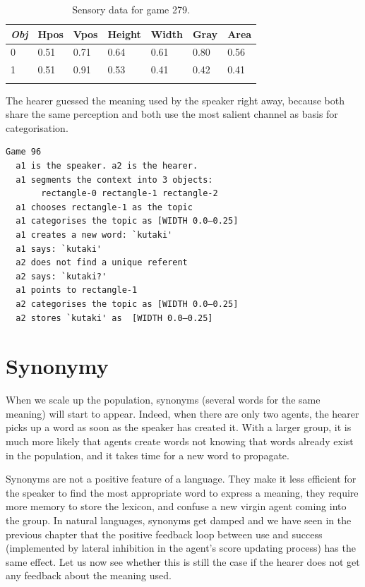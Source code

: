 \begin{table}
\begin{center}
\begin{tabular}{ l  l  l  l  l  l  l }
\lsptoprule
{\itshape Obj}&Hpos&Vpos&Height&Width&Gray&Area \\ \midrule
0 &0.51 & 0.71 & 0.64 & 0.61 & 0.80 & 0.56\\ 
1 & 0.51 & 0.91 & 0.53 & 0.41 & 0.42 & 0.41 \\ 
\lspbottomrule
\end{tabular}
\caption{\label{tab:279}Sensory data for game 279.}
\end{center}
\end{table}
The hearer guessed the meaning used
by the speaker right away, because both 
share the same perception and both use the most 
salient channel as basis for categorisation. 
\begin{verbatim}
Game 96
  a1 is the speaker. a2 is the hearer. 
  a1 segments the context into 3 objects: 
       rectangle-0 rectangle-1 rectangle-2
  a1 chooses rectangle-1 as the topic 
  a1 categorises the topic as [WIDTH 0.0–0.25]
  a1 creates a new word: `kutaki'
  a1 says: `kutaki'
  a2 does not find a unique referent
  a2 says: `kutaki?'
  a1 points to rectangle-1
  a2 categorises the topic as [WIDTH 0.0–0.25]
  a2 stores `kutaki' as  [WIDTH 0.0–0.25]
\end{verbatim}

\section{Synonymy}

When we scale up the population, synonyms (several words
for the same meaning) will start to appear. Indeed,
when there are only two agents, the hearer picks 
up a word as soon as the speaker has created it. With a larger
group, it is much more likely that agents create words
not knowing that words already exist in the population, and 
it takes time for a new word to propagate. 

Synonyms are not a positive feature of a language. They make 
it less efficient for the speaker to find the most 
appropriate word to express a meaning, they require more
memory to store the lexicon, and confuse a new virgin 
agent coming into the group. In natural languages, synonyms get
damped and we have seen in the previous chapter
that the positive feedback loop between 
use and success (implemented by lateral inhibition
in the agent's score updating process) has the same
effect. Let us now see whether this is still the 
case if the hearer does not get any feedback about the
meaning used. 

